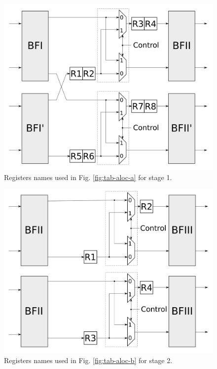 \documentclass[journal,comsoc]{IEEEtran}
\begin{document}



    \begin{figure} 
        \centering
        \includegraphics[width=0.8\linewidth]{Diagramas/folding_stage1.png}
        \caption{Registers names used in Fig. \ref{fig:tab-aloc-a} for stage 1.}
        \label{fig:folding16_stage1}
    \end{figure}
  
    \begin{figure} 
        \centering
        \includegraphics[width= 0.8\linewidth]{Diagramas/folding_stage2.png}
        \caption{Registers names used in Fig. \ref{fig:tab-aloc-b} for stage 2.}
        \label{fig:folding16_stage2}
    \end{figure}
        
\end{document}
